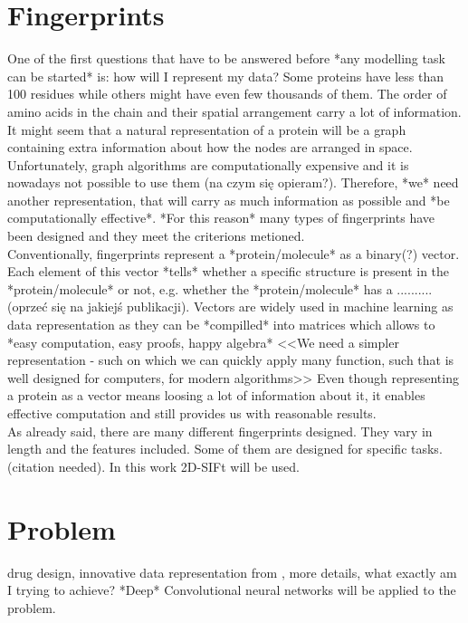 \documentclass[a4paper,10pt]{report}
\begin{document}
    \section{Fingerprints} %
    One of the first questions that have to be answered before *any modelling task can be started* is: how will I represent my data? Some proteins have less than 100 residues while others might have even few thousands of them. The order of amino acids in the chain and their spatial arrangement carry a lot of information. It might seem that a natural representation of a protein will be a graph containing extra information about how the nodes are arranged in space. Unfortunately, graph algorithms are computationally expensive and it is nowadays not possible to use them (na czym się opieram?). Therefore, *we* need another representation, that will carry as much information as possible and *be computationally effective*. *For this reason* many types of fingerprints have been designed and they meet the criterions metioned.\\
    
    Conventionally, fingerprints represent a *protein/molecule* as a binary(?) vector. Each element of this vector *tells* whether a specific structure is present in the *protein/molecule* or not, e.g. whether the *protein/molecule* has a .......... (oprzeć się na jakiejś publikacji). Vectors are widely used in machine learning as data representation as they can be *compilled* into matrices which allows to *easy computation, easy proofs, happy algebra* <<We need a simpler representation - such on which we can quickly apply many function, such that is well designed for computers, for modern algorithms>> Even though representing a protein as a vector means loosing a lot of information about it, it enables effective computation and still provides us with reasonable results.\\
    
    As already said, there are many different fingerprints designed. They vary in length and the features included. Some of them are designed for specific tasks. (citation needed). In this work 2D-SIFt will be used.\\
  
    \section{Problem} %
    drug design, innovative data representation from \cite{2DSIFT}, more details, what exactly am I trying to achieve? *Deep* Convolutional neural networks will be applied to the problem.\\
    
\end{document}
